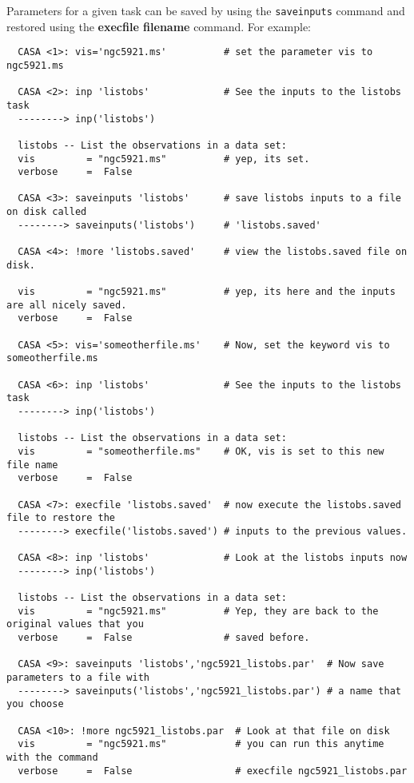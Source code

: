 Parameters for a given task can be saved by using the {\tt saveinputs}
command and restored using the {\bf execfile filename} command.  For
example:

\small
\begin{verbatim}
  CASA <1>: vis='ngc5921.ms'          # set the parameter vis to ngc5921.ms

  CASA <2>: inp 'listobs'             # See the inputs to the listobs task
  --------> inp('listobs')

  listobs -- List the observations in a data set:
  vis         = "ngc5921.ms"          # yep, its set.  
  verbose     =  False

  CASA <3>: saveinputs 'listobs'      # save listobs inputs to a file on disk called 
  --------> saveinputs('listobs')     # 'listobs.saved'

  CASA <4>: !more 'listobs.saved'     # view the listobs.saved file on disk.  

  vis         = "ngc5921.ms"          # yep, its here and the inputs are all nicely saved.  
  verbose     =  False

  CASA <5>: vis='someotherfile.ms'    # Now, set the keyword vis to someotherfile.ms

  CASA <6>: inp 'listobs'             # See the inputs to the listobs task
  --------> inp('listobs')

  listobs -- List the observations in a data set:
  vis         = "someotherfile.ms"    # OK, vis is set to this new file name
  verbose     =  False

  CASA <7>: execfile 'listobs.saved'  # now execute the listobs.saved file to restore the 
  --------> execfile('listobs.saved') # inputs to the previous values. 

  CASA <8>: inp 'listobs'             # Look at the listobs inputs now
  --------> inp('listobs')

  listobs -- List the observations in a data set:
  vis         = "ngc5921.ms"          # Yep, they are back to the original values that you 
  verbose     =  False                # saved before.  

  CASA <9>: saveinputs 'listobs','ngc5921_listobs.par'  # Now save parameters to a file with 
  --------> saveinputs('listobs','ngc5921_listobs.par') # a name that you choose

  CASA <10>: !more ngc5921_listobs.par  # Look at that file on disk
  vis         = "ngc5921.ms"            # you can run this anytime with the command 
  verbose     =  False                  # execfile ngc5921_listobs.par
\end{verbatim}
\normalsize


